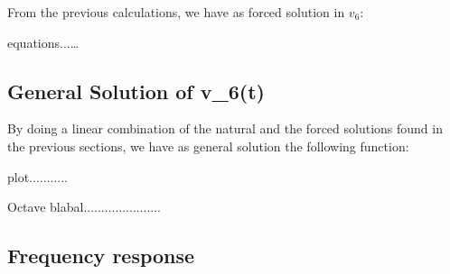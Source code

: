 From the previous calculations, we have as forced solution in $v_6$:

equations...\dots


\subsection{General Solution of v_6(t)}

By doing a linear combination of the natural and the forced solutions found in the previous sections, we have as general solution the following function:


plot...........


Octave blabal......................


\subsection{Frequency response}



